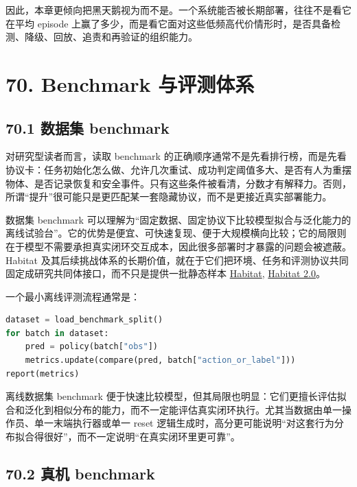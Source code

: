 因此，本章更倾向把黑天鹅视为\texttt{}而不是\texttt{}。一个系统能否被长期部署，往往不是看它在平均 episode 上赢了多少，而是看它面对这些低频高代价情形时，是否具备检测、降级、回放、追责和再验证的组织能力。

\section*{70. Benchmark 与评测体系}

\subsection*{70.1 数据集 benchmark}


对研究型读者而言，读取 benchmark 的正确顺序通常不是先看排行榜，而是先看协议卡：任务初始化怎么做、允许几次重试、成功判定阈值多大、是否有人为重摆物体、是否记录恢复和安全事件。只有这些条件被看清，分数才有解释力。否则，所谓“提升”很可能只是更匹配某一套隐藏协议，而不是更接近真实部署能力。

数据集 benchmark 可以理解为“固定数据、固定协议下比较模型拟合与泛化能力的离线试验台”。它的优势是便宜、可快速复现、便于大规模横向比较；它的局限则在于模型不需要承担真实闭环交互成本，因此很多部署时才暴露的问题会被遮蔽。Habitat 及其后续挑战体系的长期价值，就在于它们把环境、任务和评测协议共同固定成研究共同体接口，而不只是提供一批静态样本 \href{https://arxiv.org/abs/1904.01201}{Habitat}, \href{https://arxiv.org/abs/2106.14405}{Habitat 2.0}。

一个最小离线评测流程通常是：

\begin{lstlisting}[language=python]
dataset = load_benchmark_split()
for batch in dataset:
    pred = policy(batch["obs"])
    metrics.update(compare(pred, batch["action_or_label"]))
report(metrics)
\end{lstlisting}

离线数据集 benchmark 便于快速比较模型，但其局限也明显：它们更擅长评估拟合和泛化到相似分布的能力，而不一定能评估真实闭环执行。尤其当数据由单一操作员、单一末端执行器或单一 reset 逻辑生成时，高分更可能说明“对这套行为分布拟合得很好”，而不一定说明“在真实闭环里更可靠”。

\subsection*{70.2 真机 benchmark}



